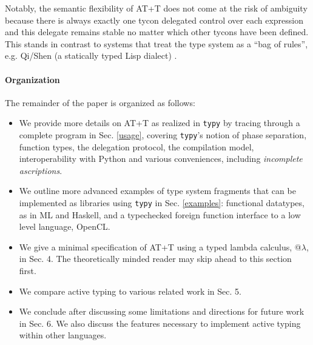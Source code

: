\documentclass{sigplanconf}
\begin{document}

Notably, the semantic flexibility of AT+T does not come at the risk of ambiguity  because there is always exactly one tycon delegated  control over each expression and this delegate remains stable no matter which other tycons have been defined. This stands in contrast to systems that treat the type system as a ``bag of rules'', e.g. Qi/Shen (a statically typed Lisp dialect) \cite{tarver2008functional}.%


\paragraph{Organization} The remainder of the paper is organized as follows:
\begin{itemize}
\item We provide more details on AT+T as realized in \verb|typy| by tracing through a complete program in Sec. \ref{usage}, covering \verb|typy|'s notion of {phase separation}, function types, the delegation protocol, the compilation model, interoperability with Python  and various conveniences, including \emph{incomplete ascriptions}.
\item We outline more advanced examples of type system fragments that can be implemented as libraries using \verb|typy| in Sec. \ref{examples}: functional datatypes, as in ML and Haskell, and a typechecked foreign function interface to a low level language, OpenCL. 
\item We give a minimal specification of AT+T using a typed lambda calculus, @$\lambda$, in Sec. 4. The theoretically minded reader may skip ahead to this section first.
\item We compare active typing to various related work in Sec. 5.
\item We conclude after discussing some limitations and directions for future work in Sec. 6. We also discuss the features necessary to implement active typing within other languages.
\end{itemize}
\end{document}
